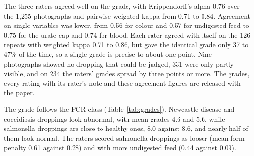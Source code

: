 \documentclass[10pt,twocolumn]{article}
\begin{document}
The three raters agreed well on the grade, with Krippendorff's alpha 0.76 over the 1,255 photographs and pairwise
weighted kappa from 0.71 to 0.84. Agreement on single variables was lower, from 0.56 for colour and 0.57 for
undigested feed to 0.75 for the urate cap and 0.74 for blood. Each rater agreed with itself on the 126 repeats with
weighted kappa 0.71 to 0.86, but gave the identical grade only 37 to 47\% of the time, so a single grade is
precise to about one point. Nine photographs showed no dropping that could be judged, 331 were only partly
visible, and on 234 the raters' grades spread by three points or more. The grades, every rating with its rater's
note and these agreement figures are released with the paper.

\begin{table}[t]
\centering
\caption{Appearance grade and model accuracy (top class equals the PCR class) on the lab-confirmed photographs. Normal looking means grade 9 or 10.
$n$ excludes the nine photographs no rater could judge. Detector is our YOLO11n scored on its top class (always answers). Bold marks the values discussed in the text. $^{*}$Only one Newcastle photograph looks normal.}
\label{tab:grades}
\end{table}

The grade follows the PCR class (Table~\ref{tab:grades}). Newcastle disease and coccidiosis droppings look
abnormal, with mean grades 4.6 and 5.6, while salmonella droppings are close to healthy ones, 8.0 against 8.6,
and nearly half of them look normal. The raters scored salmonella droppings as looser (mean form penalty 0.61
against 0.28) and with more undigested feed (0.44 against 0.09).
\end{document}
